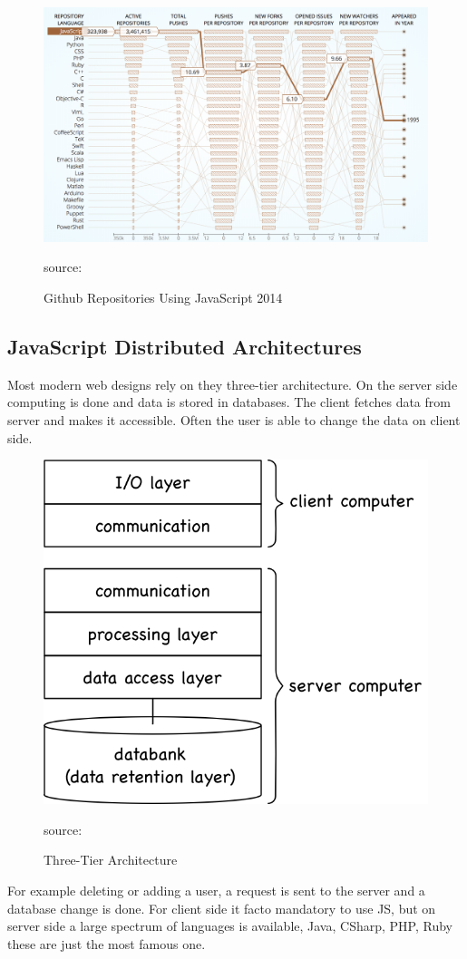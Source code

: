 \begin{figure}[H]
	\centering
	\includegraphics[width=\linewidth]{bilder/grundlagen/jsUsage.png}
	\caption{Github Repositories Using JavaScript 2014} source:\cite{GitHut}
	\label{fig:JS}
\end{figure}

\newpage

\subsection{JavaScript Distributed Architectures}
Most modern web designs rely on they three-tier architecture. On the server side computing is done and data is stored in databases. The client fetches data from  server and makes it accessible. Often the user is able to change the data on client side. 

\begin{figure}[H]
	\centering
	\includegraphics[width=0.5\linewidth]{bilder/grundlagen/Three-Tier.png}
	\caption{Three-Tier Architecture} source:\cite{TT}
	\label{fig:TT}
\end{figure}

For example deleting or adding a user, a request is sent to the server and a database change is done. For client side it facto mandatory to use \gls{JS}, but on server side  a large spectrum of languages is available, Java, CSharp, PHP, Ruby these are just the most famous one.

